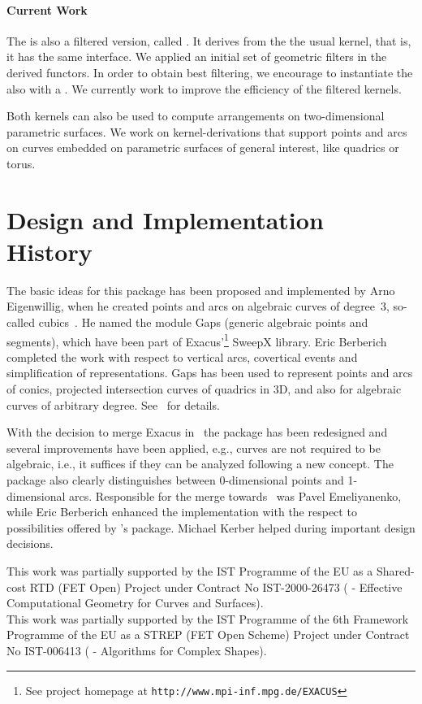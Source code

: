 \paragraph{Current Work}

The is also a filtered version, called 
. It derives from the the
usual kernel, that is, it has the same interface. We applied
an initial set of geometric filters in the derived functors. 
In order to obtain best filtering, we encourage to instantiate the
 also with a
. We currently work to improve the efficiency
of the filtered kernels.

Both kernels can also be used to compute arrangements on two-dimensional
parametric surfaces. We work on kernel-derivations that support 
points and arcs on curves embedded on parametric surfaces of 
general interest, like quadrics or torus.

\section{Design and Implementation History}

The basic ideas for this package has been proposed and implemented
by Arno Eigenwillig, when he created points and arcs on algebraic curves
of degree~3, so-called cubics~\cite{eksw-eecaccc-06}. 
He named the module {\sc Gaps} (generic algebraic points and segments), 
which have been part of {\sc Exacus}'\footnote{See project homepage at 
{\tt http://www.mpi-inf.mpg.de/EXACUS}}
{\sc SweepX} library. Eric Berberich completed the work with respect
to vertical arcs, covertical events and simplification of representations.
{\sc Gaps} has been used to represent points and arcs of conics, projected
intersection curves of quadrics in 3D, and also for algebraic curves
of arbitrary degree. See~\cite{beh+-eeeafcs-05} for details.

With the decision to merge {\sc Exacus} in \cgal\, the package has been 
redesigned and several improvements have been applied, e.g., curves are not
required to be algebraic, i.e., it suffices if they can be analyzed following
a new concept. The package also clearly distinguishes between 0-dimensional
points and 1-dimensional arcs. Responsible for the merge towards \cgal\ was
Pavel Emeliyanenko, while Eric Berberich enhanced the implementation with the
respect to possibilities offered by 
\cgal's  package. Michael Kerber helped during
important design decisions.

This work was partially supported by the IST Programme of the EU as a
Shared-cost RTD (FET Open) Project under Contract No IST-2000-26473
( - Effective
Computational Geometry for Curves and Surfaces).\\
This work was partially supported by the IST Programme of the 6th
Framework Programme of the EU as a STREP (FET Open Scheme) Project
under Contract No IST-006413 ( -
Algorithms for Complex Shapes).
